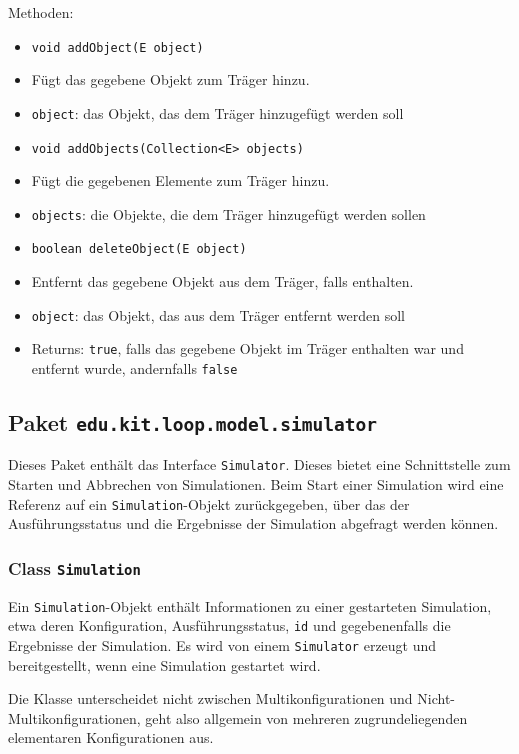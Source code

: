 \documentclass[parskip=full,11pt]{scrartcl}
\begin{document}
Methoden:
\begin{itemize}\itemsep -10pt
\item \texttt{void addObject(E object)}
\item[] Fügt das gegebene Objekt zum Träger hinzu.
\item[] \texttt{object}: das Objekt, das dem Träger hinzugefügt werden soll

\item \texttt{void addObjects(Collection<E> objects)}
\item[] Fügt die gegebenen Elemente zum Träger hinzu.
\item[] \texttt{objects}: die Objekte, die dem Träger hinzugefügt werden sollen

\item \texttt{boolean deleteObject(E object)}
\item[] Entfernt das gegebene Objekt aus dem Träger, falls enthalten.
\item[] \texttt{object}: das Objekt, das aus dem Träger entfernt werden soll
\item[] Returns: \texttt{true}, falls das gegebene Objekt im Träger enthalten war und entfernt wurde, andernfalls \texttt{false}
\end{itemize}

\subsection{Paket \texttt{edu.kit.loop.model.simulator}}
Dieses Paket enthält das Interface \texttt{Simulator}. Dieses bietet eine Schnittstelle zum Starten und Abbrechen von Simulationen. Beim Start einer Simulation wird eine Referenz auf ein \texttt{Simulation}-Objekt zurückgegeben, über das der Ausführungsstatus und die Ergebnisse der Simulation abgefragt werden können.

\subsubsection{Class \texttt{Simulation}}
Ein \texttt{Simulation}-Objekt enthält Informationen zu einer gestarteten Simulation, etwa deren Konfiguration, Ausführungsstatus, \texttt{id} und gegebenenfalls die Ergebnisse der Simulation. Es wird von einem \texttt{Simulator} erzeugt und bereitgestellt, wenn eine Simulation gestartet wird.

Die Klasse unterscheidet nicht zwischen Multikonfigurationen und Nicht-Multikonfigurationen, geht also allgemein von mehreren zugrundeliegenden elementaren Konfigurationen aus.
\end{document}
